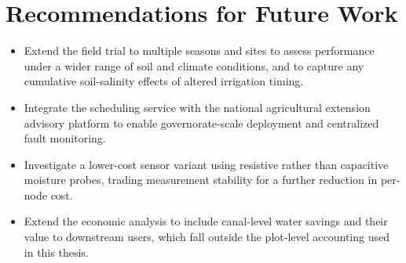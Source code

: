 \section{Recommendations for Future Work}
\begin{itemize}[leftmargin=1.4em]
\item Extend the field trial to multiple seasons and sites to assess performance under a
      wider range of soil and climate conditions, and to capture any cumulative soil-salinity
      effects of altered irrigation timing.
\item Integrate the scheduling service with the national agricultural extension advisory
      platform to enable governorate-scale deployment and centralized fault monitoring.
\item Investigate a lower-cost sensor variant using resistive rather than capacitive
      moisture probes, trading measurement stability for a further reduction in per-node
      cost.
\item Extend the economic analysis to include canal-level water savings and their value to
      downstream users, which fall outside the plot-level accounting used in this thesis.
\end{itemize}

